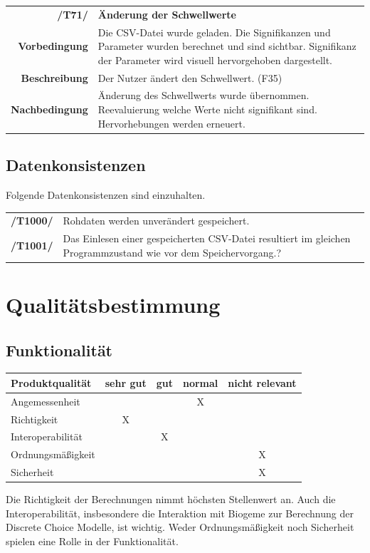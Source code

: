 \documentclass{article}
\begin{document}
\begin{table}[H]
\begin{tabularx}{\textwidth}{rX}
\textbf{/T71/}         & \textbf{Änderung der Schwellwerte} \\
\textbf{Vorbedingung}  & Die CSV-Datei wurde geladen. Die Signifikanzen und Parameter wurden berechnet und sind sichtbar. Signifikanz der Parameter wird visuell hervorgehoben dargestellt.\\
\textbf{Beschreibung}  & Der Nutzer ändert den Schwellwert. (F35) \\
\textbf{Nachbedingung} & Änderung des Schwellwerts wurde übernommen. Reevaluierung welche Werte nicht signifikant sind. Hervorhebungen werden erneuert.
\end{tabularx}
\end{table}


\subsection{Datenkonsistenzen}
Folgende Datenkonsistenzen sind einzuhalten.
\begin{table}[H]
\begin{tabularx}{\textwidth}{rX}
\textbf{/T1000/}        & Rohdaten werden unverändert gespeichert. \\              \textbf{/T1001/}        & Das Einlesen einer gespeicherten CSV-Datei resultiert im gleichen Programmzustand wie vor dem Speichervorgang.? \\
\end{tabularx}
\end{table}

\newpage

\section{Qualitätsbestimmung}
\subsection{Funktionalität}
\begin{table}[H]
\centering
\begin{tabular}{lcccc}
\hline
\textbf{Produktqualität} & sehr gut & gut & normal & nicht relevant \\ \hline
Angemessenheit           &          &     & X      &                \\
Richtigkeit              & X        &     &        &                \\
Interoperabilität        &          & X   &        &                \\
Ordnungsmäßigkeit        &          &     &        & X              \\
Sicherheit               &          &     &        & X              \\  
\end{tabular}
\end{table}
Die Richtigkeit der Berechnungen nimmt höchsten Stellenwert an. Auch die Interoperabilität, insbesondere die Interaktion mit Biogeme zur Berechnung der Discrete Choice Modelle, ist wichtig. Weder Ordnungsmäßigkeit noch Sicherheit spielen eine Rolle in der Funktionalität.
\end{document}
